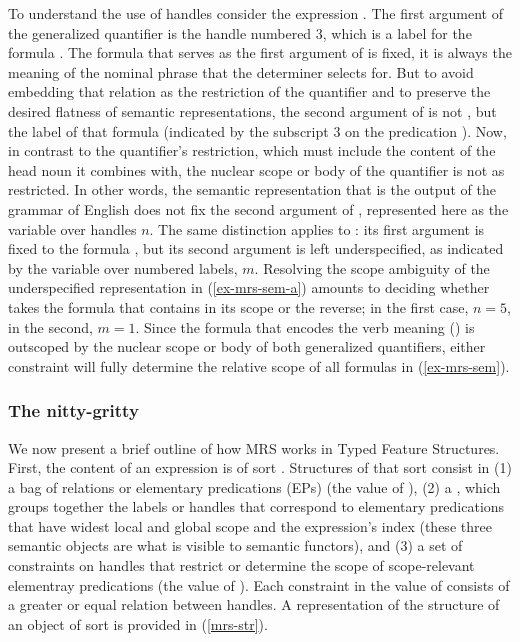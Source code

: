 \documentclass[output=paper]{langsci/langscibook}
\begin{document}
To understand the use of handles consider the expression . The first argument of the generalized quantifier is the handle numbered 3, which is a label for the formula . The formula that serves as the first argument of  is fixed, it is always the meaning of the nominal phrase that the determiner selects for. But to avoid embedding that relation as the restriction of the quantifier and to preserve the desired flatness of semantic representations, the second argument of  is not , but the label of that formula (indicated by the subscript $3$ on the predication ). Now, in contrast to the quantifier's restriction, which must include the content of the head noun it combines with, the nuclear scope or body of the quantifier is not as restricted. In other words, the semantic representation that is the output of the grammar of English does not fix the second argument of , represented here as the variable over handles $n$. The same distinction applies to : its first argument is fixed to the formula , but its second argument is left underspecified, as indicated by the variable over numbered labels, $m$. Resolving the scope ambiguity of the underspecified representation in (\ref{ex-mrs-sem-a}) amounts to deciding whether  takes the formula that contains  in its scope or the reverse; in the first case, $n=5$, in the second, $m=1$. Since the formula that encodes the verb meaning () is outscoped by the nuclear scope or body of both generalized quantifiers, either constraint will fully determine the relative scope of all formulas in (\ref{ex-mrs-sem}). 



\subsubsection{The nitty-gritty}

We now present a brief outline of how MRS works in Typed Feature Structures. First, the content of an expression is of sort . Structures of that sort consist in (1) a bag of relations or elementary predications (EPs) (the value of ), (2) a , which groups together the labels or handles that correspond to elementary predications that have widest local and global scope and the expression's index (these three semantic objects are what is visible to semantic functors), and (3) a set of constraints on handles that restrict or determine the scope of scope-relevant elementray predications (the value of ). Each constraint in the value of  consists of a greater or equal relation between handles. A representation of the structure of an object of sort   is provided in (\ref{mrs-str}).
\end{document}
